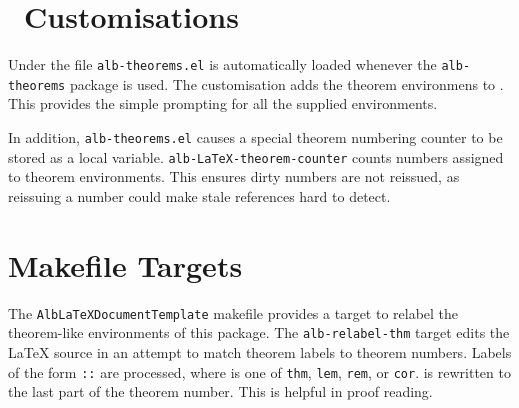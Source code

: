 \documentclass[11pt,a4paper,oneside,titlepage]{alb-latex}
\begin{document}

\section{\AUCTeX\ Customisations}
\label{sec:alb-theorems-documentation:auctex-cust}

Under \AUCTeX{} the file \texttt{alb-theorems.el} is automatically
loaded whenever the \texttt{alb-theorems} package is used.  The
customisation adds the theorem environmens to \AUCTeX{}.  This provides
the simple prompting for all the supplied environments.

In addition, \texttt{alb-theorems.el} causes a special theorem numbering
counter to be stored as a local variable.
\texttt{alb-LaTeX-theorem-counter} counts numbers assigned to theorem
environments.  This ensures dirty numbers are not reissued, as reissuing
a number could make stale references hard to detect.




\section{Makefile Targets}
\label{sec:alb-theorems-documentation:makef-targ}

The \texttt{AlbLaTeXDocumentTemplate} makefile provides a target to
relabel the theorem-like environments of this package.  The
\texttt{alb-relabel-thm} target edits the \LaTeX{} source in an attempt
to match theorem labels to theorem numbers.  Labels of the form
\texttt{:}\texttt{:}
are processed, where  is one of \texttt{thm},
\texttt{lem}, \texttt{rem}, or \texttt{cor}.  is
rewritten to the last part of the theorem number.  This is helpful in
proof reading.
\end{document}
